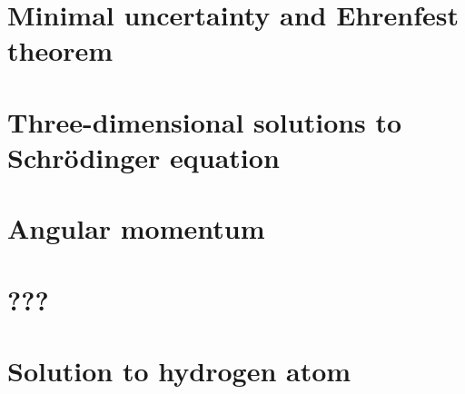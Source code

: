\documentclass{article}
\begin{document}
\section{Minimal uncertainty and Ehrenfest theorem}

\section{Three-dimensional solutions to Schr\"odinger equation}

\section{Angular momentum}

\section{???}

\section{Solution to hydrogen atom}

\end{document}
